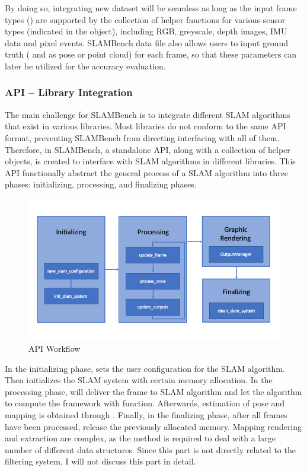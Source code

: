 By doing so, integrating new dataset will be seamless as long as the input frame types () are supported by the collection of helper functions for various sensor types (indicated in the  object), including RGB, greyscale, depth images, IMU data and pixel events. 
SLAMBench data file also allows users to input ground truth ( and  as pose or point cloud) for each frame, so that these parameters can later be utilized for the accuracy evaluation. 

\subsubsection*{API – Library Integration }
The main challenge for SLAMBench is to integrate different SLAM algorithms that exist in various libraries. 
Most libraries do not conform to the same API format, preventing SLAMBench from directing interfacing with all of them. 
Therefore, in SLAMBench, a standalone API, along with a collection of helper objects, is created to interface with SLAM algorithms in different libraries. 
This API functionally abstract the general process of a SLAM algorithm into three phases: initializing, processing, and finalizing phases. 

\begin{figure}[h]
	\caption{API Workflow \cite{bodin2018slambench2}}
	\includegraphics[width=14cm]{figures/api-workflow.png}
	\centering
\end{figure}

In the initializing phase,  sets the user configuration for the SLAM algorithm. 
Then  initializes the SLAM system with certain memory allocation. 
In the processing phase,  will deliver the frame to SLAM algorithm and let the algorithm to compute the framework with  function. 
Afterwards, estimation of pose and mapping is obtained through . 
Finally, in the finalizing phase, after all frames have been processed,  release the previously allocated memory. 
Mapping rendering and extraction are complex, as the method is required to deal with a large number of different data structures. 
Since this part is not directly related to the filtering system, I will not discuss this part in detail.

